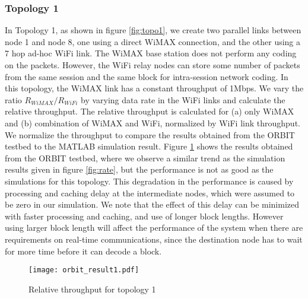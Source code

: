 \documentclass{sig-alternate-10pt}
\begin{document}
\subsubsection{Topology 1}
In Topology 1, as shown  in figure \ref{fig:topo1}, we create  two parallel links between node 1 and node 8, one using a direct WiMAX connection, and the other using a  7 hop ad-hoc WiFi link. The WiMAX base station does not perform any coding on the packets. However, the WiFi relay nodes can store some number of packets from the same session and the same block for intra-session network coding.  In this topology, the  WiMAX link has a constant throughput of 1Mbps.   We vary the ratio $R_{WiMAX}/R_{WiFi}$ by varying data rate in the WiFi links and calculate the relative throughput. The relative throughput is calculated  for (a) only WiMAX and (b) combination of WiMAX and WiFi,  normalized by WiFi link throughput. We normalize the throughput to compare the results obtained from the ORBIT testbed to the MATLAB simulation result. Figure \ref{fig:orbitres1} shows the results obtained from the ORBIT testbed, where we observe a  similar trend as the simulation results  given in figure \ref{fig:rate}, but the performance is not as good as the simulations for this topology. This degradation in the  performance is caused by  processing and caching delay at the intermediate nodes, which were assumed to be zero in our simulation. We note that the effect of this delay can be minimized with faster processing and caching, and use of longer block lengths.  However using larger block length will affect the performance of the system when there are requirements on real-time communications, since the destination node has to wait  for more time before it can decode a block.


\begin{figure}[t]
\texttt{[image: orbit\_result1.pdf]}
\caption{Relative throughput for topology 1}
\label{fig:orbitres1}
\end{figure}
\end{document}
